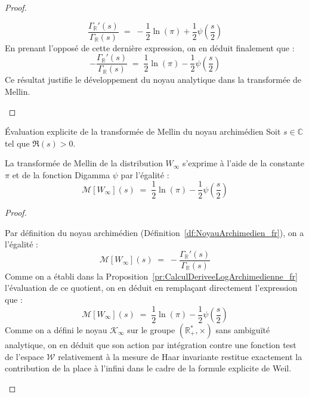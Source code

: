 \documentclass[Riemann_Hypothesis.tex]{subfiles}
\begin{document}
\begin{proof}
\begin{part_proof}
\begin{equation*}
            \frac{\Gamma_{\mathbb{R}}'(s)}{\Gamma_{\mathbb{R}}(s)} \;=\; -\frac{1}{2}\ln(\pi) + \frac{1}{2}\psi\left(\frac{s}{2}\right)
        \end{equation*}
        En prenant l'opposé de cette dernière expression, on en déduit finalement que :
        \begin{equation*}
            -\frac{\Gamma_{\mathbb{R}}'(s)}{\Gamma_{\mathbb{R}}(s)} \;=\; \frac{1}{2}\ln(\pi) - \frac{1}{2}\psi\left(\frac{s}{2}\right)
        \end{equation*}
        Ce résultat justifie le développement du noyau analytique dans la transformée de Mellin.
    \end{part_proof}
\end{proof}



\begin{corollaire}[label=cr:EvaluationMellinNoyauArchimedien_fr]{Évaluation explicite de la transformée de Mellin du noyau archimédien}
    Soit $s \in \mathbb{C}$ tel que $\Re(s) > 0$. \par
    La transformée de Mellin de la distribution $W_{\infty}$ s'exprime à l'aide de la constante $\pi$ et de la fonction Digamma $\psi$ par l'égalité :
    \begin{equation*}
        \mathcal{M}[W_{\infty}](s) \;=\; \frac{1}{2}\ln(\pi) - \frac{1}{2}\psi\left(\frac{s}{2}\right)
    \end{equation*}
\end{corollaire}

\begin{proof}
    \begin{part_proof}
        Par définition du noyau archimédien (Définition~\ref{df:NoyauArchimedien_fr}), 
        on a l'égalité :
        \begin{equation*}
            \mathcal{M}[W_{\infty}](s) \;=\; -\frac{\Gamma_{\mathbb{R}}'(s)}{\Gamma_{\mathbb{R}}(s)}
        \end{equation*}
        Comme on a établi dans la Proposition~\ref{pr:CalculDeriveeLogArchimedienne_fr} 
        l'évaluation de ce quotient, on en déduit en remplaçant directement l'expression 
        que :
        \begin{equation*}
            \mathcal{M}[W_{\infty}](s) \;=\; \frac{1}{2}\ln(\pi) - \frac{1}{2}\psi\left(\frac{s}{2}\right)
        \end{equation*}
        Comme on a défini le noyau $\mathcal{K}_{\infty}$ sur le groupe $(\mathbb{R}_+^*, \times)$ sans ambiguïté analytique, on en déduit que son action par intégration contre une fonction test de l'espace $\mathcal{W}$ relativement à la mesure de Haar invariante restitue exactement la contribution de la place à l'infini dans le cadre de la formule explicite de Weil.
    \end{part_proof}
\end{proof}
\end{document}
